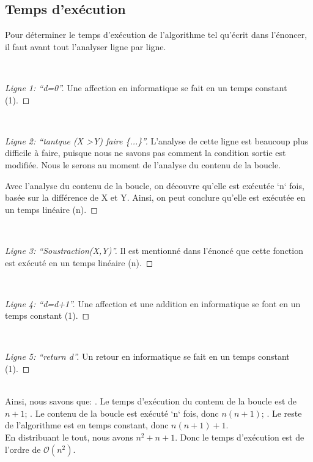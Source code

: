 \documentclass[12pt]{article}
\begin{document}
	 \subsection*{Temps d'exécution}
    Pour déterminer le temps d'exécution de l'algorithme tel qu'écrit dans l'énoncer, 
    il faut avant tout l'analyser ligne par ligne.
    
    ~\begin{proof}[Ligne 1: ``d=0'']
    	Une affection en informatique se fait en un temps constant (1).
    \end{proof}
     
     ~\begin{proof}[Ligne 2: ``tantque (X \textgreater  Y) faire \{...\}'']
	L'analyse de cette ligne est beaucoup plus difficile à faire, puisque nous
	ne savons pas comment la condition sortie est modifiée. Nous le serons
	au moment de l'analyse du contenu de la boucle. \newline
	
	Avec l'analyse du contenu de la boucle, on découvre qu'elle est exécutée
	`n` fois, basée sur la différence de X et Y. Ainsi, on peut conclure qu'elle
	est exécutée en un temps linéaire (n).
    \end{proof}
    
     ~\begin{proof}[Ligne 3: ``Soustraction(X,Y)'']
	Il est mentionné dans l'énoncé que cette fonction est exécuté en un temps
	linéaire (n).
    \end{proof}
    
    ~\begin{proof}[Ligne 4: ``d=d+1'']
    	Une affection et une addition en informatique se font en un temps constant (1).
    \end{proof}

    ~\begin{proof}[Ligne 5: ``return d'']
    	Un retour en informatique se fait en un temps constant (1).
    \end{proof}
    \ \\
    \noindent Ainsi, nous savons que: . Le temps d'exécution du contenu de la boucle est de $n + 1$; . Le contenu de la boucle est exécuté `n` fois, donc $n(n + 1)$; . Le reste de l'algorithme est en temps constant, donc $n(n + 1) + 1$. \newline
    \ \\
    En distribuant le tout, nous avons $n^{2}+n+1$. Donc le temps d'exécution est
     de l'ordre de \( \mathcal{O}(n^2) \).
    
\end{document}
